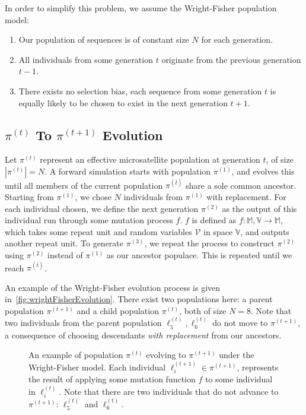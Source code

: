In order to simplify this problem, we assume the Wright-Fisher population model:
\begin{enumerate}
    \item Our population of sequences is of constant size $N$ for each generation.
    \item All individuals from some generation $t$ originate from the previous generation $t - 1$.
    \item There exists no selection bias, each sequence from some generation $t$ is equally likely to be
        chosen to exist in the next generation $t+1$.
\end{enumerate}

\subsection{$\pi^{(t)}$ To $\pi^{(t+1)}$ Evolution}\label{subsec:piTopiEvolution}
Let $\pi^{(t)}$ represent an effective microsatellite population at generation $t$, of size
$\left|\pi^{(t)} \right| = N$.
A forward simulation starts with population $\pi^{(1)}$, and evolves this until all members of the current
population $\pi^{(\overbar{t})}$ share a sole common ancestor.
Starting from $\pi^{(1)}$, we chose $N$ individuals from $\pi^{(1)}$ with replacement.
For each individual chosen, we define the next generation $\pi^{(2)}$ as the output of this individual run through some
mutation process $f$.
$f$ is defined as $f : \mathbb{M},\mathbb{V} \rightarrow \mathbb{M}$, which takes some repeat unit and random variables
$\mathcal{V}$ in space $\mathbb{V}$, and outputs another repeat unit.
To generate $\pi^{(3)}$, we repeat the process to construct $\pi^{(2)}$ using $\pi^{(2)}$ instead of $\pi^{(1)}$ as
our ancestor populace.
This is repeated until we reach $\pi^{(\overbar{t})}$.

An example of the Wright-Fisher evolution process is given in~\autoref{fig:wrightFisherEvolution}.
There exist two populations here: a parent population $\pi^{(t+1)}$ and a child population $\pi^{(t)}$, both of
size $N=8$.
Note that two individuals from the parent population $\ell^{(t)}_5, \ell^{(t)}_6$ do not move to $\pi^{(t+1)}$, a
consequence of choosing descendants \emph{with replacement} from our ancestors.

\begin{figure}[t]
    \centering{}
    \caption{An example of population $\pi^{(t)}$ evolving to $\pi^{(t+1)}$ under the Wright-Fisher model.
    Each individual $\ell^{(t+1)}_i \in \pi^{(t+1)}$, represents the result of applying some mutation function $f$ to
    some individual in $\ell^{(t)}_i$.
    Note that there are two individuals that do not advance to $\pi^{(t+1)}$: $\ell^{(t)}_5$ and $\ell^{(t)}_6$.}
    \label{fig:wrightFisherEvolution}
\end{figure}

